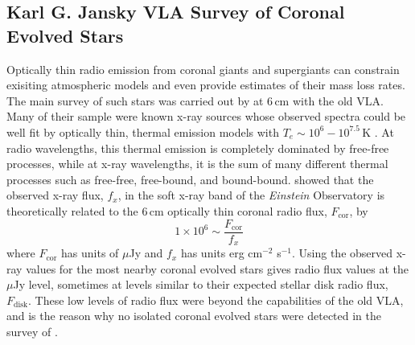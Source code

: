 
\subsection{Karl G. Jansky VLA Survey of Coronal Evolved Stars}\label{sec:8.2.4}
Optically thin radio emission from coronal giants and supergiants can constrain exisiting atmospheric models and even provide estimates of their mass loss rates. The main survey of such stars was carried out by \cite{drake_1986} at 6\,cm with the old VLA. Many of their sample were known x-ray sources whose observed spectra could be well fit by optically thin, thermal emission models with $T_e \sim 10^6-10^{7.5}$\,K \citep{ayres_1981}. At radio wavelengths, this thermal emission is completely dominated by free-free processes, while at x-ray wavelengths, it is the sum of many different thermal processes such as free-free, free-bound, and bound-bound. \cite{drake_1986} showed that the observed x-ray flux, $f_{x}$, in the soft x-ray band of the \textit{Einstein} Observatory is theoretically related to the 6\,cm optically thin coronal radio flux, $F_{\mathrm{cor}}$, by
\begin{equation}\label{eq:8.1}
1\times 10^6 \sim \frac{F_{\mathrm{cor}}}{f_x}
\end{equation}
where $F_{\mathrm{cor}}$ has units of $\mu$Jy and $f_x$ has units erg cm$^{-2}$ s$^{-1}$. Using the observed x-ray values for the most nearby coronal evolved stars gives radio flux values at the $\mu$Jy level, sometimes at levels similar to their expected stellar disk radio flux, $F_{\mathrm{disk}}$. These low levels of radio flux were  beyond the capabilities of the old VLA, and is the reason why no isolated coronal evolved stars were detected in the survey of \cite{drake_1986}.


